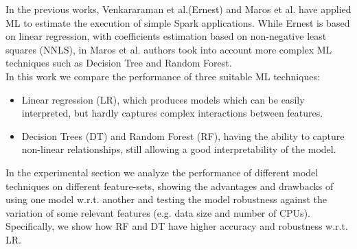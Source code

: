 \documentclass[a4paper, 10pt, conference]{ieeeconf}      %
\begin{document}
In the previous works, Venkararaman et al.(Ernest) \cite{ernest} and Maros et al.\cite{ARDAGNA2019} have applied ML to estimate the execution of simple Spark applications. While Ernest is based on linear regression, with coefficients estimation based on non-negative least squares (NNLS), in Maros et al. authors took into account more complex ML techniques such as Decision Tree and Random Forest.\\
In this work we compare the performance of three suitable ML techniques:
\begin{itemize}
    \item Linear regression (LR), which produces models which can be easily interpreted, but hardly captures complex interactions between features.
    \item Decision Trees (DT) and Random Forest (RF), having the ability to capture non-linear relationships, still allowing a good interpretability of the model.
\end{itemize}

In the experimental section we analyze the performance of different model techniques on different feature-sets, showing the advantages and drawbacks of using one model w.r.t. another and testing the model robustness against the variation of some relevant features  (e.g. data size and number of CPUs). Specifically, we show how RF and DT have higher accuracy and robustness w.r.t. LR. 





\end{document}
